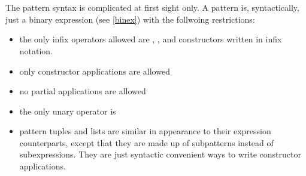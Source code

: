 \begin{flushleft}
  \sym{::}  \alt{} \\
   
  \alt {}\\
  \sym{:} 
  \alt {}\\
   
  \alt {} \\
  
  \alt {}\\
 \sym{!}  \alt{}  \\
     
    \alt {} \sym{\{}  \sym{\}}
    \alt {}        
    \alt {}
    \alt \sym{(} \sym{)}    
    \alt \sym{[} \sym{]}            \\
    \alt \sym{[}  \sym{]} \\
    \alt  \sym{(} \sym{,} \sym{)}       \\
    \alt \sym{(}  \sym{)}\\    

     
    \alt \regex{\_}           \\

 \\
\end{flushleft}

The pattern syntax is complicated at first sight only. A pattern is, syntactically, just a binary expression (see \autoref{binex}) with the follwoing restrictions:
\begin{itemize}
\item the only infix operators allowed are , , \sym{:} and constructors written in infix notation.
\item only constructor applications are allowed
\item no partial applications are allowed
\item the only unary operator is \sym{!}
\item pattern tuples and lists are similar in appearance to their expression counterparts, except that they are made up of subpatterns instead of subexpressions. They are just syntactic convenient ways to write constructor applications.
\end{itemize}

